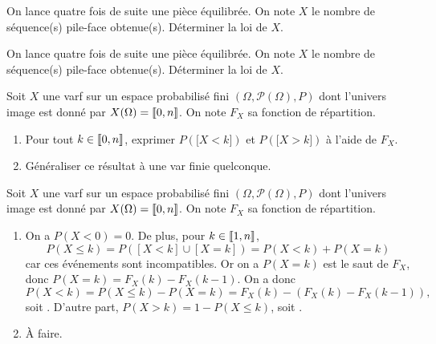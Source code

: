 \documentclass[a4paper, 11pt,reqno]{article}
\begin{document}
\begin{exercice}
	On lance quatre fois de suite une pi\`ece \'equilibr\'ee. On note $X$ le nombre de s\'equence(s) pile-face obtenue(s). D\'eterminer la loi de $X$.
\end{exercice}
\begin{correction}
	On lance quatre fois de suite une pi\`ece \'equilibr\'ee. On note $X$ le nombre de s\'equence(s) pile-face obtenue(s). D\'eterminer la loi de $X$.
\end{correction}


%
%
%
\begin{exercice}
	Soit $X$ une varf sur un espace probabilis\'e fini $(\Omega,\mathcal{P}(\Omega),P)$ dont l'univers image est donn\'e par $X(\Omega)=\llbracket  0,n\rrbracket$. On note $F_X$ sa fonction de r\'epartition.
	\begin{enumerate}
		\item Pour tout $k\in\llbracket  0,n\rrbracket$, exprimer $P(\lbrack X<k\rbrack)$ et $P(\lbrack X>k\rbrack)$ \`a l'aide de $F_X$.
		\item G\'en\'eraliser ce r\'esultat \`a une var finie quelconque.
	\end{enumerate}
\end{exercice}
\begin{correction}
	Soit $X$ une varf sur un espace probabilis\'e fini $(\Omega,\mathcal{P}(\Omega),P)$ dont l'univers image est donn\'e par $X(\Omega)=\llbracket  0,n\rrbracket$. On note $F_X$ sa fonction de r\'epartition.
	\begin{enumerate}
		\item On a $P(X<0)= 0$. De plus, pour $k \in\llbracket  1,n\rrbracket$,
		      $$P(X\leq k) = P([X<k] \cup [X=k]) = P(X<k) + P(X=k)$$
		      car ces \'ev\'enements sont incompatibles. Or on a $P(X=k)$ est le saut de $F_X$, donc $P(X=k) = F_X(k)-F_X(k-1)$. On a donc
		      $$P(X<k) = P(X\leq k) - P(X=k) = F_X(k) - (F_X(k)-F_X(k-1)),$$
		      soit .
		      D'autre part, $P(X>k) = 1-P(X\leq k)$, soit  .
		\item \`A faire.%
	\end{enumerate}
\end{correction}
\end{document}
